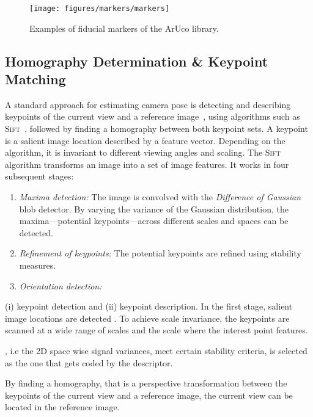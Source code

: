 \documentclass{report}
\begin{document}


\begin{figure}[h!]
\begin{center}
\texttt{[image: figures/markers/markers]}
\caption{{\label{fig:aruco}
Examples of fiducial markers of the ArUco library.%
}}
\end{center}
\end{figure}

\subsection{Homography Determination \& Keypoint Matching}
\label{sec:keypointmatching}

A standard approach for estimating camera pose is detecting and
describing keypoints of the current view and a reference
image~\cite{se2002global}, using algorithms such as
\textsc{Sift}~\cite{lowe1999object}, followed by finding a homography
between both keypoint sets. A keypoint is a salient image location
described by a feature vector. Depending on the algorithm, it is
invariant to different viewing angles and scaling. The \textsc{Sift}
algorithm transforms an image into a set of image features. It works
in four subsequent stages:
\begin{enumerate}
\item \emph{Maxima detection:} The image is convolved with the
  \emph{Difference of Gaussian} blob detector. By varying the variance
  of the Gaussian distribution, the maxima---potential
  keypoints---across different scales and spaces can be detected.
\item \emph{Refinement of keypoints:} The potential keypoints are
  refined using stability measures.
\item \emph{Orientation detection:} 
\end{enumerate}

(i) keypoint detection and (ii) keypoint
description. In the first stage, salient image locations are detected
. To achieve scale invariance, the keypoints are scanned at a wide
range of scales and the scale where the interest point features.


, i.e the 2D space wise
signal variances, meet certain stability criteria, is selected as the
one that gets coded by the descriptor.

By finding a homography, that is a perspective
transformation between the keypoints of the current view and a
reference image, the current view can be located in the reference
image.
\end{document}
